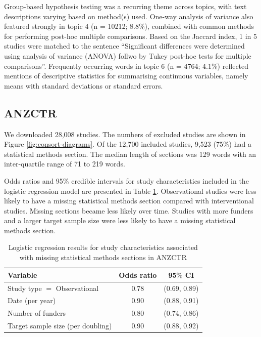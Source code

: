 \documentclass[12pt]{article}
\begin{document}
Group-based hypothesis testing was a recurring theme across topics, with
text descriptions varying based on method(s) used. One-way analysis of
variance also featured strongly in topic 4 (n = 10212; 8.8\%), combined
with common methods for performing post-hoc multiple comparisons. Based
on the Jaccard index, 1 in 5 studies were matched to the sentence
``Significant differences were determined using analysis of variance
(ANOVA) follwo by Tukey post-hoc tests for multiple comparisons''.
Frequently occurring words in topic 6 (n = 4764; 4.1\%) reflected
mentions of descriptive statistics for summarising continuous variables,
namely means with standard deviations or standard errors.

\subsection{ANZCTR}

We downloaded 28,008 studies. The numbers of excluded studies are shown
in Figure \ref{fig:consort-diagrams}. Of the 12,700 included studies,
9,523 (75\%) had a statistical methods section. The median length of
sections was 129 words with an inter-quartile range of 71 to 219 words.

Odds ratios and 95\% credible intervals for study characteristics
included in the logistic regression model are presented in Table
\ref{tab:anzctr-missing-odds}. Observational studies were less likely to
have a missing statistical methods section compared with interventional
studies. Missing sections became less likely over time. Studies with
more funders and a larger target sample size were less likely to have a
missing statistical methods section.

\begin{table}[]
\centering
\caption{Logistic regression results for study characteristics associated with missing statistical methods sections in ANZCTR}
\label{tab:anzctr-missing-odds}
\begin{tabular}{lcc}
\hline
Variable & Odds ratio & 95$\%$ CI \\
\hline
Study type $=$ Observational & 0.78 & (0.69, 0.89) \\
Date (per year) & 0.90 & (0.88, 0.91) \\
Number of funders & 0.80 & (0.74, 0.86) \\
Target sample size (per doubling) & 0.90 & (0.88, 0.92)\\
\hline
\end{tabular}
\end{table}
\end{document}
